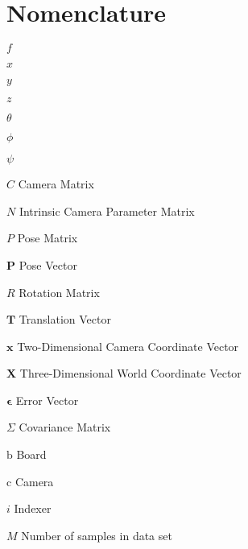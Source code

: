 \chapter{Nomenclature}

\begin{Nomencl}[2cm]

   \item[$f$]	      
   \item[$x$]         
   \item[$y$]         
   \item[$z$]         
   \item[$\theta$]    
   \item[$\phi$]      
   \item[$\psi$]      \\

   \item[$C$]		Camera Matrix
   \item[$N$]		Intrinsic Camera Parameter Matrix
   \item[$P$]		Pose Matrix
   \item[$\bm{P}$]	Pose Vector
   \item[$R$]		Rotation Matrix
   \item[$\bm{T}$]	Translation Vector
   \item[$\bm{x}$]	Two-Dimensional Camera Coordinate Vector
   \item[$\bm{X}$]	Three-Dimensional World Coordinate Vector
   \item[$\bm{\epsilon}$]	Error Vector
   \item[$\Sigma$] 	Covariance Matrix

   \item[$\mathrm{b}$]          Board
   \item[$\mathrm{c}$] 		Camera
   \item[$i$]			Indexer
   \item[$M$]			Number of samples in data set


\end{Nomencl}
